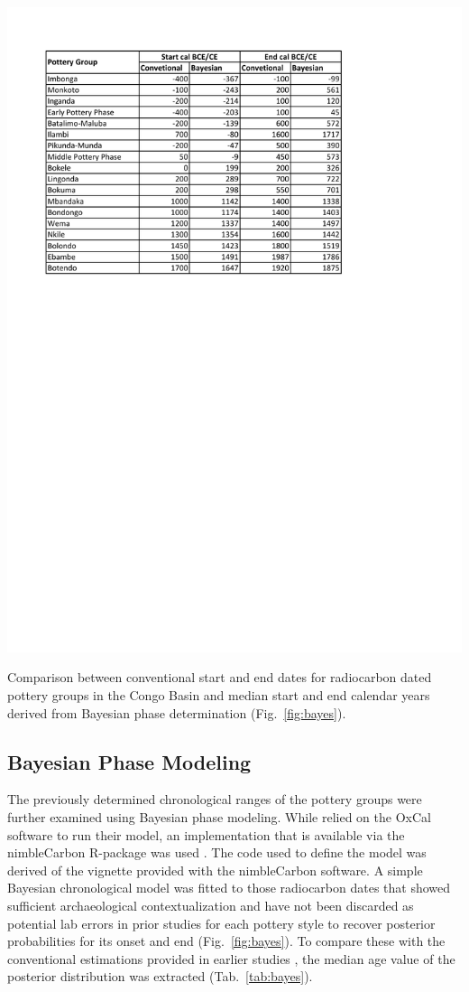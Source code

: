 \documentclass[smallextended,natbib]{svjour3}       %
\begin{document}
\begin{table}[!tbp]
	\centering
	\includegraphics[width=.75\textwidth]{tbl/tbl_bayesphases_comparison.pdf}
	\caption{Comparison between conventional start and end dates for radiocarbon dated pottery groups in the Congo Basin \citep[Data S2]{Seidensticker.2021} and median start and end calendar years derived from Bayesian phase determination (Fig.~\ref{fig:bayes}).}
	\label{tab:bayes}
\end{table}

\subsection*{Bayesian Phase Modeling}

The previously determined chronological ranges of the pottery groups \citep{Seidensticker.2021e, Seidensticker.2021} were further examined using Bayesian phase modeling. While \cite{Crema.2020a} relied on the OxCal software to run their model, an implementation that is available via the nimbleCarbon R-package was used \cite{Crema.2021a,Crema.2021b}. The code used to define the model was derived of the vignette provided with the nimbleCarbon software. A simple Bayesian chronological model was fitted to those radiocarbon dates that showed sufficient archaeological contextualization and have not been discarded as potential lab errors in prior studies \cite[9]{Seidensticker.2021} for each pottery style to recover posterior probabilities for its onset and end (Fig.~\ref{fig:bayes}). To compare these with the conventional estimations provided in earlier studies \cite[\url{https://github.com/dirkseidensticker/aSCAC};][Data S2]{Seidensticker.2021}, the median age value of the posterior distribution was extracted (Tab.~\ref{tab:bayes}).
\end{document}
